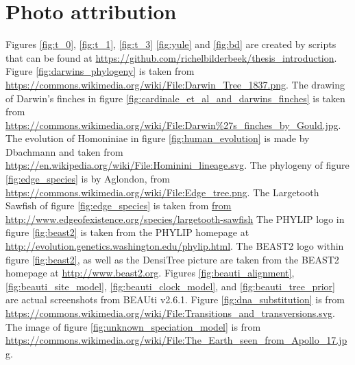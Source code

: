 \section{Photo attribution}

Figures \ref{fig:t_0}, \ref{fig:t_1}, \ref{fig:t_3} 
\ref{fig:yule} and \ref{fig:bd} are created by
scripts that can be found at \url{https://github.com/richelbilderbeek/thesis_introduction}.
Figure \ref{fig:darwins_phylogeny} is taken from \url{https://commons.wikimedia.org/wiki/File:Darwin_Tree_1837.png}.
The drawing of Darwin's finches in figure \ref{fig:cardinale_et_al_and_darwins_finches}
is taken from \url{https://commons.wikimedia.org/wiki/File:Darwin%27s_finches_by_Gould.jpg}.
The evolution of Homoniniae in figure \ref{fig:human_evolution} is made by Dbachmann 
and taken from \url{https://en.wikipedia.org/wiki/File:Hominini_lineage.svg}.
The phylogeny of figure \ref{fig:edge_species} 
is by Aglondon, from \url{https://commons.wikimedia.org/wiki/File:Edge_tree.png}.
The Largetooth Sawfish of figure \ref{fig:edge_species}
is taken from \url{from http://www.edgeofexistence.org/species/largetooth-sawfish}
The PHYLIP logo in figure \ref{fig:beast2} is taken from the PHYLIP homepage at \url{http://evolution.genetics.washington.edu/phylip.html}.
The BEAST2 logo within figure \ref{fig:beast2},
as well as the DensiTree picture are 
taken from the BEAST2 homepage at \url{http://www.beast2.org}.
Figures \ref{fig:beauti_alignment},
\ref{fig:beauti_site_model},
\ref{fig:beauti_clock_model},
and \ref{fig:beauti_tree_prior}
are actual screenshots from BEAUti v2.6.1.
Figure \ref{fig:dna_substitution} is from \url{https://commons.wikimedia.org/wiki/File:Transitions_and_transversions.svg}.
The image of figure \ref{fig:unknown_speciation_model}
is from \url{https://commons.wikimedia.org/wiki/File:The_Earth_seen_from_Apollo_17.jpg}.

